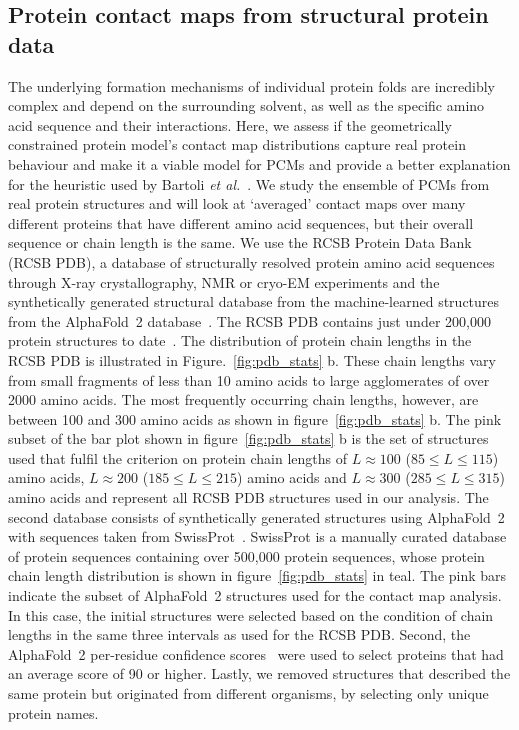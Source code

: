 \documentclass[10pt]{iopart}
\begin{document}
\subsection{Protein contact maps from structural protein data}

The underlying formation mechanisms of individual protein folds are incredibly complex and depend on the surrounding solvent, as well as the specific amino acid sequence and their interactions. Here, we assess if the geometrically constrained protein model's contact map distributions capture real protein behaviour and make it a viable model for PCMs and provide a better explanation for the heuristic used by Bartoli \textit{et al.}~\cite{bartoli2008effecta}. We study the ensemble of PCMs from real protein structures and will look at `averaged' contact maps over many different proteins that have different amino acid sequences, but their overall sequence or chain length is the same. 
We use the RCSB Protein Data Bank (RCSB PDB), a database of structurally resolved protein amino acid sequences through X-ray crystallography, NMR or cryo-EM experiments and the synthetically generated structural database from the machine-learned structures from the AlphaFold~2 database~\cite{varadi2022alphafold}. The RCSB PDB contains just under 200,000 protein structures to date~\cite{berman2000protein}. The distribution of protein chain lengths in the RCSB PDB is illustrated in Figure.~\ref{fig:pdb_stats} b. These chain lengths vary from small fragments of less than 10 amino acids to large agglomerates of over 2000 amino acids. The most frequently occurring chain lengths, however, are between 100 and 300 amino acids as shown in figure~\ref{fig:pdb_stats} b. The pink subset of the bar plot shown in figure~\ref{fig:pdb_stats} b is the set of structures used that fulfil the criterion on protein chain lengths of $L\approx100$ ($85\le L\le 115$) amino acids, $L\approx 200$ ($185 \le L \le 215$) amino acids and $L\approx300$ ($285 \le L\le 315$) amino acids and represent all RCSB PDB structures used in our analysis. The second database consists of synthetically generated structures using AlphaFold~2 with sequences taken from SwissProt~\cite{bairoch2000swissprot}. SwissProt is a manually curated database of protein sequences containing over 500,000 protein sequences, whose protein chain length distribution is shown in figure~\ref{fig:pdb_stats} in teal. The pink bars indicate the subset of AlphaFold~2 structures used for the contact map analysis. In this case, the initial structures were selected based on the condition of chain lengths in the same three intervals as used for the RCSB PDB. Second, the AlphaFold~2 per-residue confidence scores~\cite{jumper2021highly} were used to select proteins that had an average score of 90 or higher. Lastly, we removed structures that described the same protein but originated from different organisms, by selecting only unique protein names. 
\end{document}
